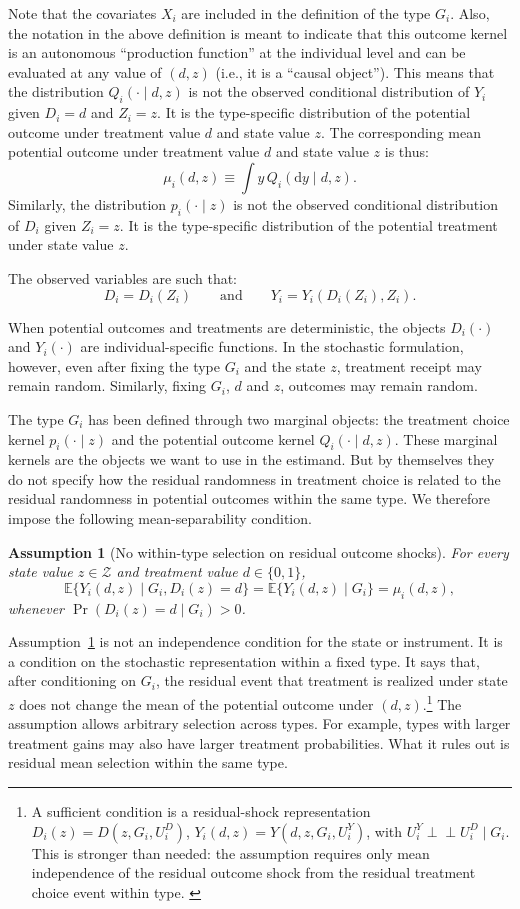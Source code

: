 \documentclass[11pt]{article}
\newtheorem{assumption}{Assumption}
\newcommand{\E}{\mathbb{E}}
\newcommand{\1}{\mathbf{1}}
\newcommand{\dd}{\mathrm{d}}
\newcommand{\Perp}{\perp \!\!\! \perp}
\begin{document}
Note that the covariates $X_i$ are included in the definition of the type $G_i$.
Also, the notation in the above definition is meant to indicate that this outcome kernel is an autonomous  ``production function'' at the individual level and can be evaluated at any value of $(d,z)$ (i.e., it is a ``causal object''). This means that the distribution $Q_i(\cdot\mid d,z)$ is not the observed conditional distribution of $Y_i$ given $D_i=d$ and $Z_i=z$. It is the type-specific distribution of the potential outcome under treatment value $d$ and state value $z$.  The corresponding mean potential outcome under treatment value $d$ and state value $z$ is thus:
\[
        \mu_i(d,z) \equiv \int y\,Q_i(\dd y\mid d,z).
\]
Similarly, the distribution $p_i(\cdot \mid z)$ is not the observed conditional distribution of $D_i$ given $Z_i=z$.  It is the type-specific distribution of the potential treatment under state value $z$.

The observed variables are such that:
\[
        D_i=D_i(Z_i)
        \qquad \textrm{and} \qquad
        Y_i=Y_i(D_i(Z_i),Z_i).
\]


When potential outcomes and treatments are deterministic, the objects
\(D_i(\cdot)\) and \(Y_i(\cdot)\) are individual-specific functions. In the
stochastic formulation, however, even after fixing the type \(G_i\) and the
state \(z\), treatment receipt may remain random.  Similarly, fixing $G_i$, $d$ and $z$, outcomes may remain random.

The type \(G_i\) has been defined through two marginal objects: the
treatment choice kernel \(p_i(\cdot\mid z)\) and the potential outcome kernel
\(Q_i(\cdot\mid d,z)\). These marginal kernels are the objects we want to use
in the estimand. But by themselves they do not specify how the residual
randomness in treatment choice is related to the residual randomness in
potential outcomes within the same type. We therefore impose the following
mean-separability condition.

\begin{assumption}[No within-type selection on residual outcome shocks]
\label{ass:separability}
For every state value \(z\in\mathcal Z\) and treatment value
\(d\in\{0,1\}\),
\[
\E\{Y_i(d,z)\mid G_i,D_i(z)=d\}
=
\E\{Y_i(d,z)\mid G_i\}
=
\mu_i(d,z),
\]
whenever \(\Pr(D_i(z)=d\mid G_i)>0\).
\end{assumption}

Assumption~\ref{ass:separability} is not an independence condition for the
state or instrument. It is a condition on the stochastic representation within
a fixed type. It says that, after conditioning on \(G_i\), the residual event
that treatment is realized under state \(z\) does not change the mean of the
potential outcome under \((d,z)\).\footnote{A sufficient condition is a residual-shock representation
\(D_i(z)=D(z,G_i,U_i^D)\), \(Y_i(d,z)=Y(d,z,G_i,U_i^Y)\), with
\(U_i^Y\Perp U_i^D\mid G_i\). This is stronger than needed: the assumption
requires only mean independence of the residual outcome shock from the residual
treatment choice event within type. \label{assumption1}} The assumption allows arbitrary selection
across types. For example, types with larger treatment gains may also have
larger treatment probabilities. What it rules out is residual mean selection
within the same type.
\end{document}
